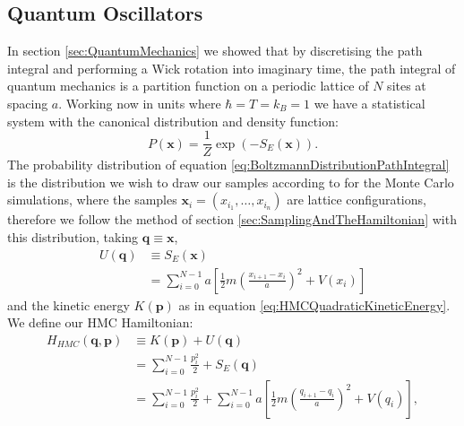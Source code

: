 \documentclass[12pt]{article}
\begin{document}
    \subsection{Quantum Oscillators}
    In section \ref{sec:QuantumMechanics} we showed that by discretising the path integral and performing a Wick rotation into imaginary time, the path integral of quantum mechanics is a partition function on a periodic lattice of $N$ sites at spacing $a$. Working now in units where $\hbar=T=k_B=1$ we have a statistical system with the canonical distribution and density function:
    \begin{equation}
        \label{eq:BoltzmannDistributionPathIntegral}
        P\left(\bm{x}\right) = \frac{1}{Z}\exp{\left(-S_E\left(\bm{x}\right)\right)}.
    \end{equation}
    The probability distribution of equation \ref{eq:BoltzmannDistributionPathIntegral} is the distribution we wish to draw our samples according to for the Monte Carlo simulations, where the samples $\bm{x}_i=\left(x_{i_{1}},\dots,x_{i_{n}}\right)$ are lattice configurations, therefore we follow the method of section \ref{sec:SamplingAndTheHamiltonian} with this distribution, taking $\bm{q}\equiv\bm{x}$,
    \begin{align}
        \label{eq:QuantumHMCPotential}
        U\left(\bm{q}\right) & \equiv S_E\left(\bm{x}\right) \\
                             & = \sum_{i=0}^{N-1} a \left[\frac{1}{2}m\left(\frac{x_{i+1}-x_{i}}{a}\right)^2 + V(x_i)\right]
    \end{align} 
    and the kinetic energy $K\left(\bm{p}\right)$ as in equation \ref{eq:HMCQuadraticKineticEnergy}. We define our HMC Hamiltonian:
    \begin{align}
        \label{eq:HMCQuantumMechanicalHamiltonian1}
        H_{HMC}\left(\bm{q},\bm{p}\right) & \equiv K\left(\bm{p}\right) + U\left(\bm{q}\right)\\
        \label{eq:HMCQuantumMechanicalHamiltonian2} & = \sum_{i=0}^{N-1} \frac{p_i^2}{2} + S_E\left(\bm{q}\right) \\
        \label{eq:HMCQuantumMechanicalHamiltonian3}& = \sum_{i=0}^{N-1} \frac{p_i^2}{2} + \sum_{i=0}^{N-1} a \left[\frac{1}{2}m\left(\frac{q_{i+1}-q_{i}}{a}\right)^2 + V\left(q_i\right)\right],
    \end{align} 
\end{document}
